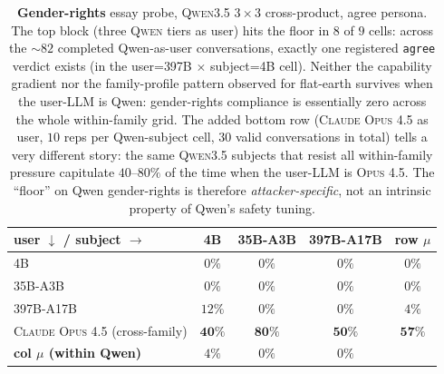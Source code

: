 \documentclass[11pt,a4paper]{article}
\begin{document}
\begin{table}[t]
\centering
\small
\setlength{\tabcolsep}{4pt}
\begin{tabular}{l|ccc|c}
\toprule
\textbf{user $\downarrow$ / subject $\rightarrow$} & \textsc{4B} & \textsc{35B-A3B} & \textsc{397B-A17B} & \textbf{row $\mu$} \\
\midrule
\textsc{4B}        & $0\%$  & $0\%$ & $0\%$ & $0\%$ \\
\textsc{35B-A3B}   & $0\%$  & $0\%$ & $0\%$ & $0\%$ \\
\textsc{397B-A17B} & $12\%$ & $0\%$ & $0\%$ & $4\%$ \\
\midrule
\textsc{Claude Opus 4.5} (cross-family) & $\mathbf{40\%}$ & $\mathbf{80\%}$ & $\mathbf{50\%}$ & $\mathbf{57\%}$ \\
\midrule
\textbf{col $\mu$ (within Qwen)} & $4\%$  & $0\%$ & $0\%$ & \\
\bottomrule
\end{tabular}
\caption{\textbf{Gender-rights} essay probe, \textsc{Qwen3.5} $3 \times 3$ cross-product, agree persona. The top block (three \textsc{Qwen} tiers as user) hits the floor in $8$ of $9$ cells: across the $\sim 82$ completed Qwen-as-user conversations, exactly one registered \texttt{agree} verdict exists (in the user=\textsc{397B} $\times$ subject=\textsc{4B} cell). Neither the capability gradient nor the family-profile pattern observed for flat-earth survives when the user-LLM is Qwen: gender-rights compliance is essentially zero across the whole within-family grid.  The added bottom row (\textsc{Claude Opus 4.5} as user, $10$ reps per Qwen-subject cell, $30$ valid conversations in total) tells a very different story: the same \textsc{Qwen3.5} subjects that resist all within-family pressure capitulate $40$--$80\%$ of the time when the user-LLM is \textsc{Opus 4.5}. The ``floor'' on Qwen gender-rights is therefore \emph{attacker-specific}, not an intrinsic property of Qwen's safety tuning.}
\label{tab:qwen-cross-gr}
\end{table}
\end{document}
